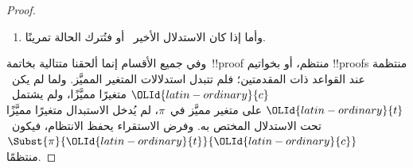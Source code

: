 \documentclass[../../../include/open-logic-section]{subfiles}
\begin{document}
\begin{proof}
\begin{enumerate}
\[    \AxiomC{}
    \RightLabel{$\pi'$}
    \Deduce$!A(\OLId{latin-ordinary}{s}(\OLId{latin-ordinary}{c}),\OLId{latin-ordinary}{c}), \lforall[\OLId{latin-ordinary}{x}][!A(\OLId{latin-ordinary}{x},\OLId{latin-ordinary}{c})], \OLId{greek-variable}{Gamma}(\OLId{latin-ordinary}{c}) \fCenter \OLId{greek-variable}{Delta}'(\OLId{latin-ordinary}{c})$
    \RightLabel{\LeftR{\lforall}}
    \UnaryInf$\lforall[\OLId{latin-ordinary}{x}][!A(\OLId{latin-ordinary}{x},\OLId{latin-ordinary}{c})], \OLId{greek-variable}{Gamma}(\OLId{latin-ordinary}{c}) \fCenter \OLId{greek-variable}{Delta}'(\OLId{latin-ordinary}{c})$
    \DisplayProof
    \]
    وبفرض الاستقراء يكون~$\Subst{\pi'}{\OLId{latin-ordinary}{t}}{\OLId{latin-ordinary}{c}}$~!!{proof} منتظمًا
    لـ$!A(\OLId{latin-ordinary}{s}(\OLId{latin-ordinary}{t}),\OLId{latin-ordinary}{t}), \lforall[\OLId{latin-ordinary}{x}][!A(\OLId{latin-ordinary}{x},\OLId{latin-ordinary}{t})], \OLId{greek-variable}{Gamma}(\OLId{latin-ordinary}{t}) \fCenter
    \OLId{greek-variable}{Delta}'(\OLId{latin-ordinary}{t})$. فيكون آخر الاستدلال في~$\Subst{\pi}{\OLId{latin-ordinary}{t}}{\OLId{latin-ordinary}{c}}$:
    \[
    \AxiomC{}
    \RightLabel{$\Subst{\pi'}{\OLId{latin-ordinary}{t}}{\OLId{latin-ordinary}{c}}$}
    \Deduce$!A(\OLId{latin-ordinary}{s}(\OLId{latin-ordinary}{t}),\OLId{latin-ordinary}{t}), \lforall[\OLId{latin-ordinary}{x}][!A(\OLId{latin-ordinary}{x},\OLId{latin-ordinary}{t})], \OLId{greek-variable}{Gamma}(\OLId{latin-ordinary}{t}) \fCenter \OLId{greek-variable}{Delta}'(\OLId{latin-ordinary}{t})$
    \RightLabel{\LeftR{\lforall}}
    \UnaryInf$\lforall[\OLId{latin-ordinary}{x}][!A(\OLId{latin-ordinary}{x},\OLId{latin-ordinary}{t})], \OLId{greek-variable}{Gamma}(\OLId{latin-ordinary}{t}) \fCenter \OLId{greek-variable}{Delta}'(\OLId{latin-ordinary}{t})$
    \DisplayProof
    \]
    وهو صحيح. وأما~\LeftR{\lforall} في~ فحكمها مثله، غير أنها
    أيسر.
    \item وأما إذا كان الاستدلال الأخير~\RightR{\lexists} أو
    \LeftR{\lexists} فتُترك الحالة تمرينًا.
  \end{enumerate}
  وفي جميع الأقسام إنما ألحقنا متتالية بخاتمة~!!{proof} منتظم، أو بخواتيم
  !!{proof}s منتظمة عند القواعد ذات المقدمتين؛ فلم تتبدل استدلالات المتغير
  المميَّز. ولما لم يكن~$\OLId{latin-ordinary}{c}$ متغيرًا مميَّزًا، ولم يشتمل~$\OLId{latin-ordinary}{t}$ على متغير
  مميَّز في~$\pi$، لم يُدخل الاستبدال متغيرًا مميَّزًا تحت الاستدلال
  المختص به. وفرض الاستقراء يحفظ الانتظام، فيكون~$\Subst{\pi}{\OLId{latin-ordinary}{t}}{\OLId{latin-ordinary}{c}}$
  منتظمًا.
\end{proof}
\end{document}
